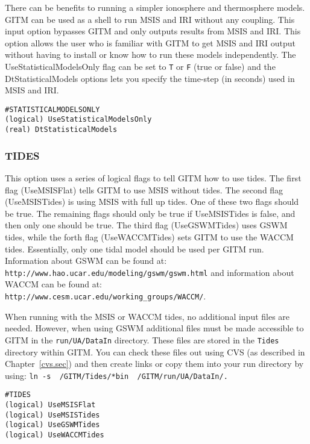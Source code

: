 There can be benefits to running a simpler ionosphere and thermosphere models.  GITM can be used as a shell to run MSIS and IRI without any coupling.  This input option bypasses GITM and only outputs results from MSIS and IRI.  This option allows the user who is familiar with GITM to get MSIS and IRI output without having to install or know how to run these models independently.  The UseStatisticalModelsOnly flag can be set to {\tt T} or {\tt F} (true or false) and the DtStatisticalModels options lets you specify the time-step (in seconds) used in MSIS and IRI.

\begin{verbatim}
#STATISTICALMODELSONLY
(logical) UseStatisticalModelsOnly
(real) DtStatisticalModels
\end{verbatim}

\subsubsection{TIDES}
\label{tides}

This option uses a series of logical flags to tell GITM how to use tides.   The first flag (UseMSISFlat) tells GITM to use MSIS without tides.  The second flag (UseMSISTides) is using MSIS with full up tides. One of these two flags should be true.  The remaining flags should only be true if UseMSISTides is false, and then only one should be true.  The third flag (UseGSWMTides) uses GSWM tides, while the forth flag (UseWACCMTides) sets GITM to use the WACCM tides.  Essentially, only one tidal model should be used per GITM run.  Information about GSWM can be found at: \\{\tt http://www.hao.ucar.edu/modeling/gswm/gswm.html} and information about WACCM can be found at: \\{\tt http://www.cesm.ucar.edu/working\_groups/WACCM/}.

When running with the MSIS or WACCM tides, no additional input files are needed.  However, when using GSWM additional files must be made accessible to GITM in the {\tt run/UA/DataIn} directory.  These files are stored in the {\tt Tides} directory within GITM.  You can check these files out using CVS (as described in Chapter~\ref{cvs.sec}) and then create links or copy them into your run directory by using: {\tt ln -s ~/GITM/Tides/*bin ~/GITM/run/UA/DataIn/.}

\begin{verbatim}
#TIDES
(logical) UseMSISFlat      
(logical) UseMSISTides      
(logical) UseGSWMTides     
(logical) UseWACCMTides    
\end{verbatim}

